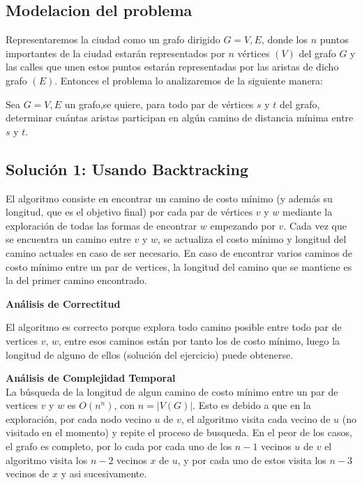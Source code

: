 \documentclass[
10pt, %
a4paper, %
oneside, %
headinclude,footinclude, %
BCOR5mm, %
]{scrartcl}
\begin{document}
\subsection{Modelacion del problema}

Representaremos la ciudad como un grafo dirigido $G = {V,E}$, donde los $n$ puntos importantes
de la ciudad estarán representados por $n$ vértices $(V)$ del grafo $G$ y las calles que unen estos 
puntos estarán representadas por las aristas de dicho grafo $(E)$. Entonces el problema lo analizaremos
de la siguiente manera:

Sea $G = {V,E}$ un grafo,se quiere, para todo par de vértices $s$ y $t$ del grafo, determinar cuántas aristas 
participan en algún camino de distancia mínima entre $s$ y $t$.


\subsection{Solución 1: Usando Backtracking}

El algoritmo consiste en encontrar un camino de costo mínimo (y además su longitud, que es el objetivo final) por cada par
de vértices $v$ y $w$ mediante la exploración de todas las formas de encontrar $w$ empezando por $v$. Cada vez que se
encuentra un camino entre $v$ y $w$, se actualiza el costo mínimo y longitud del camino actuales en caso de ser
necesario. En caso de encontrar varios caminos de costo mínimo entre un par de vertices, la longitud del camino que
se mantiene es la del primer camino encontrado.


\textbf{Análisis de Correctitud}

El algoritmo es correcto porque explora todo camino posible entre todo par de vertices $v$, $w$, entre esos caminos
están por tanto los de costo mínimo, luego la longitud de alguno de ellos (solución del ejercicio) puede obtenerse.


\textbf{Análisis de Complejidad Temporal}\\

La búsqueda de la longitud de algun camino de costo mínimo entre un par de vertices $v$ y $w$ es $ O (n^n)$, con
$n = |V(G)|$. Esto es debido a que en la exploración, por cada nodo vecino $u$ de $v$, el algoritmo visita cada
vecino de $u$ (no visitado en el momento) y repite el proceso de busqueda. En el peor de los casos, el grafo es completo,
por lo cada por cada uno de los $n-1$ vecinos $u$ de $v$ el algoritmo visita los $n-2$ vecinos $x$ de $u$, y por cada uno
de estos visita los $n-3$ vecinos de $x$ y asi sucesivamente.
\end{document}
